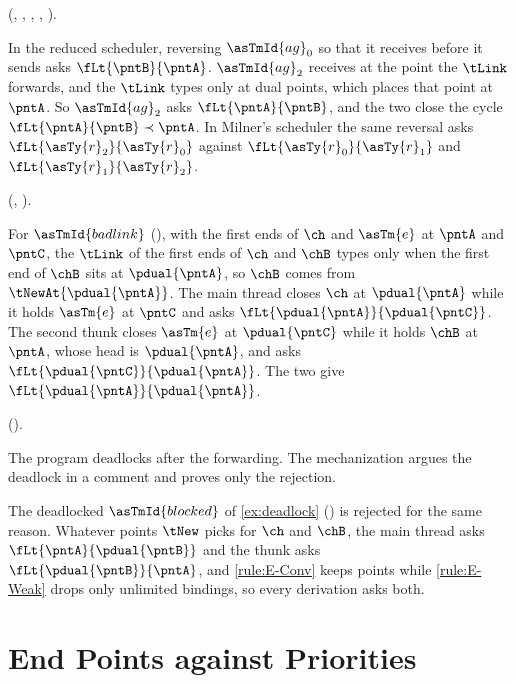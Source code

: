 (, , , , ).

\begin{theorem}
\label{thm:rej-sched}
  In the reduced scheduler, reversing $\asTmId{ag}_0$ so that it
  receives before it sends asks $\fLt{\pntB}{\pntA}$. $\asTmId{ag}_2$
  receives at the point the $\tLink$ forwards, and the $\tLink$ types
  only at dual points, which places that point at $\pntA$. So
  $\asTmId{ag}_2$ asks $\fLt{\pntA}{\pntB}$, and the two close the cycle
  $\fLt{\pntA}{\pntB} \prec \pntA$. In Milner's scheduler the same
  reversal asks $\fLt{\asTy{r}_2}{\asTy{r}_0}$ against
  $\fLt{\asTy{r}_0}{\asTy{r}_1}$ and
  $\fLt{\asTy{r}_1}{\asTy{r}_2}$.
\end{theorem}

(, ).

\begin{theorem}
\label{thm:rej-link}
  For $\asTmId{badlink}$ (), with the first ends of
  $\ch$ and $\asTm{e}$ at $\pntA$ and $\pntC$, the $\tLink$ of the first
  ends of $\ch$ and $\chB$ types only when the first end of $\chB$ sits
  at $\pdual{\pntA}$, so $\chB$ comes from
  $\tNewAt{\pdual{\pntA}}$. The main thread closes $\ch$ at
  $\pdual{\pntA}$ while it holds $\asTm{e}$ at $\pntC$ and asks
  $\fLt{\pdual{\pntA}}{\pdual{\pntC}}$. The second thunk closes
  $\asTm{e}$ at $\pdual{\pntC}$ while it holds $\chB$ at $\pntA$, whose
  head is $\pdual{\pntA}$, and asks $\fLt{\pdual{\pntC}}{\pdual{\pntA}}$.
  The two give $\fLt{\pdual{\pntA}}{\pdual{\pntA}}$.
\end{theorem}

().

The program deadlocks after the forwarding. The mechanization argues
the deadlock in a comment and proves only the rejection.

The deadlocked $\asTmId{blocked}$ of \cref{ex:deadlock}
() is rejected for the same reason. Whatever points
$\tNew$ picks for $\ch$ and $\chB$, the main thread asks
$\fLt{\pntA}{\pdual{\pntB}}$ and the thunk asks
$\fLt{\pdual{\pntB}}{\pntA}$, and
\ref{rule:E-Conv} keeps points while \ref{rule:E-Weak} drops only
unlimited bindings, so every derivation asks both.



\section{End Points against Priorities}
\label{sec:app-endpoints}

